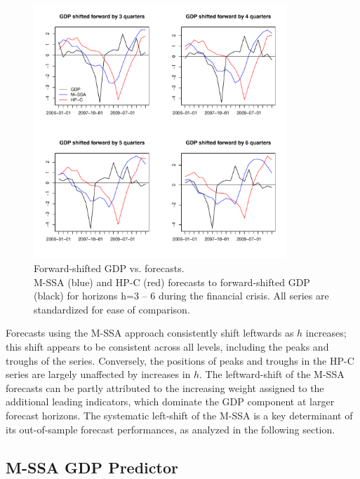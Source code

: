 \documentclass[11pt,a4paper]{article}
\begin{document}
\begin{figure}[H]
    \begin{center}
        \includegraphics[width=0.85\textwidth]{./Figures/mssa_hpc_financial_crisis.pdf}
        \caption{Forward-shifted GDP vs. forecasts.\\
         M-SSA (blue) and HP-C (red) forecasts to forward-shifted GDP (black) for horizons h=3 – 6 during the financial crisis. All series are standardized for ease of comparison.
        \label{fig:mssa_hpc_financial_crisis}}
    \end{center}
\end{figure}

Forecasts using the M-SSA approach consistently shift leftwards as $h$ increases; this shift appears to be consistent across all levels, including the peaks and troughs of the series. Conversely, the positions of peaks and troughs in the HP-C series are largely unaffected by increases in $h$. The leftward-shift of the M-SSA forecasts can be partly attributed to the increasing weight assigned to the additional leading indicators, which dominate the GDP component at larger forecast horizons. %
The systematic left-shift of the M-SSA is a key determinant of its out-of-sample forecast performances, as analyzed in the following section. 


\subsection{M-SSA GDP Predictor}\label{sec:mSSA_component}
\end{document}

